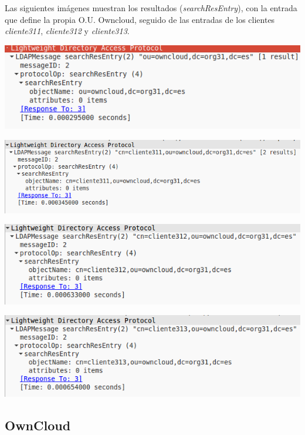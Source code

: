 \documentclass[]{article}
\begin{document}
Las siguientes imágenes muestran los resultados (\textit{searchResEntry}), con la entrada que define la propia O.U. Owncloud, seguido de las entradas de los clientes \textit{cliente311}, \textit{cliente312} y \textit{cliente313}.

\begin{center}
	\includegraphics[scale=0.5]{images/ldap/ldap3}
\end{center}
\begin{center}
	\includegraphics[scale=0.5]{images/ldap/ldap4}
\end{center}
\begin{center}
	\includegraphics[scale=0.5]{images/ldap/ldap5}
\end{center}

\begin{center}
	\includegraphics[scale=0.5]{images/ldap/ldap6}
\end{center}


\subsection{OwnCloud}
\end{document}
